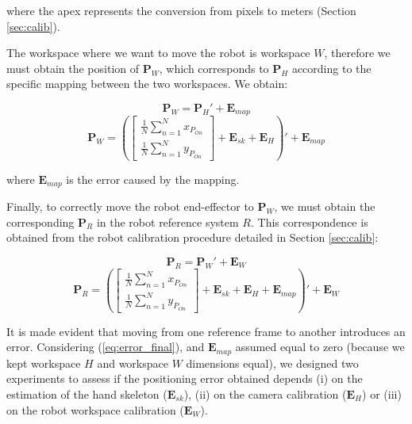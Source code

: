 \documentclass[a4paper, 10 pt, conference]{ieeeconf}      %
\begin{document}
where the apex represents the conversion from pixels to meters (Section \ref{sec:calib}).

The workspace where we want to move the robot is workspace $W$, therefore we must obtain the position of $\mathbf{P}_W$, which corresponds to $\mathbf{P}_H$ according to the specific mapping between the two workspaces. We obtain:

\begin{equation}
\mathbf{P}_W = \mathbf{P}_H' + \mathbf{E}_{map}
\end{equation}
\begin{equation}
\mathbf{P}_W = \left(\begin{bmatrix}
\frac{1}{N}\sum_{n=1}^{N}x_{P_{On}} \\
\frac{1}{N}\sum_{n=1}^{N}y_{P_{On}}
\end{bmatrix} + \mathbf{E}_{sk} + \mathbf{E}_{H}\right)' + \mathbf{E}_{map}
\end{equation}

where $\mathbf{E}_{map}$ is the error caused by the mapping.

Finally, to correctly move the robot end-effector to $\mathbf{P}_W$, we must obtain the corresponding $\mathbf{P}_R$ in the robot reference system $R$. This correspondence is obtained from the robot calibration procedure detailed in Section \ref{sec:calib}: 

\begin{equation}
\mathbf{P}_R = \mathbf{P}_W' + \mathbf{E}_W
\end{equation}
\begin{equation}\label{eq:error_final}
\mathbf{P}_R = \left(\begin{bmatrix}
\frac{1}{N}\sum_{n=1}^{N}x_{P_{On}} \\
\frac{1}{N}\sum_{n=1}^{N}y_{P_{On}}
\end{bmatrix} + \mathbf{E}_{sk} + \mathbf{E}_{H} + \mathbf{E}_{map} \right)' + \mathbf{E}_W
\end{equation}

It is made evident that moving from one reference frame to another introduces an error. Considering (\ref{eq:error_final}), and $\mathbf{E}_{map}$ assumed equal to zero (because we kept workspace $H$ and workspace $W$ dimensions equal), we designed two experiments to assess if the positioning error obtained depends (i) on the estimation of the hand skeleton ($\mathbf{E}_{sk}$), (ii) on the camera calibration ($\mathbf{E}_{H}$) or (iii) on the robot workspace calibration ($\mathbf{E}_{W}$).
\end{document}
